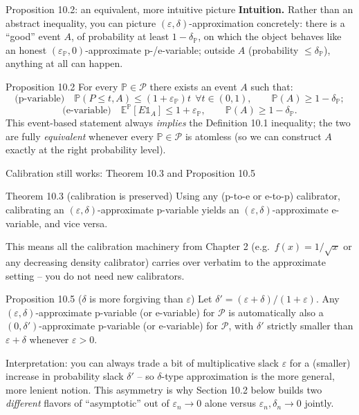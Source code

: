 \documentclass[aspectratio=169,10pt]{beamer}
\newcommand{\E}{\mathbb{E}}
\newcommand{\Pb}{\mathbb{P}}
\newcommand{\calP}{\mathcal{P}}
\begin{document}
\begin{frame}{Proposition 10.2: an equivalent, more intuitive picture}
  \textbf{Intuition.} Rather than an abstract inequality, you can picture $(\varepsilon,\delta)$-approximation concretely: there is a ``good'' event $A$, of probability at least $1-\delta_\Pb$, on which the object behaves like an honest $(\varepsilon_\Pb,0)$-approximate p-/e-variable; outside $A$ (probability $\leq \delta_\Pb$), anything at all can happen.
  \begin{block}{Proposition 10.2}
    For every $\Pb\in\calP$ there exists an event $A$ such that:
    \[
      \text{(p-variable)}\quad \Pb(P\leq t, A) \leq (1+\varepsilon_\Pb)t \ \ \forall t\in(0,1), \qquad \Pb(A)\geq 1-\delta_\Pb;
    \]
    \[
      \text{(e-variable)}\quad \E^{\Pb}[E\mathbb{1}_A] \leq 1+\varepsilon_\Pb, \qquad \Pb(A)\geq 1-\delta_\Pb.
    \]
    This event-based statement always \emph{implies} the Definition 10.1 inequality; the two are fully \emph{equivalent} whenever every $\Pb\in\calP$ is atomless (so we can construct $A$ exactly at the right probability level).
  \end{block}
\end{frame}

\begin{frame}{Calibration still works: Theorem 10.3 and Proposition 10.5}
  \begin{block}{Theorem 10.3 (calibration is preserved)}
    Using any (p-to-e or e-to-p) calibrator, calibrating an $(\varepsilon,\delta)$-approximate p-variable yields an $(\varepsilon,\delta)$-approximate e-variable, and vice versa.
  \end{block}
  This means all the calibration machinery from Chapter 2 (e.g.\ $f(x)=1/\sqrt x$ or any decreasing density calibrator) carries over verbatim to the approximate setting -- you do not need new calibrators.

  \vspace{0.2cm}
  \begin{block}{Proposition 10.5 ($\delta$ is more forgiving than $\varepsilon$)}
    Let $\delta' = (\varepsilon+\delta)/(1+\varepsilon)$. Any $(\varepsilon,\delta)$-approximate p-variable (or e-variable) for $\calP$ is automatically also a $(0,\delta')$-approximate p-variable (or e-variable) for $\calP$, with $\delta' $ strictly smaller than $\varepsilon+\delta$ whenever $\varepsilon>0$.
  \end{block}
  Interpretation: you can always trade a bit of multiplicative slack $\varepsilon$ for a (smaller) increase in probability slack $\delta'$ -- so $\delta$-type approximation is the more general, more lenient notion. This asymmetry is why Section 10.2 below builds two \emph{different} flavors of ``asymptotic'' out of $\varepsilon_n\to0$ alone versus $\varepsilon_n,\delta_n\to0$ jointly.
\end{frame}
\end{document}
